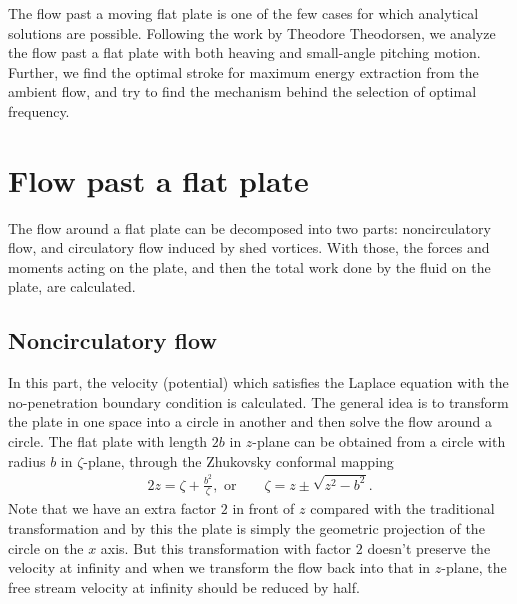 
The flow past a moving flat plate is one of the few cases for which analytical solutions are possible.
Following the work by Theodore Theodorsen, we analyze the flow past a flat plate with both heaving and small-angle pitching motion. 
Further, we find the optimal stroke for maximum energy extraction from the ambient flow, and try to find the mechanism behind the selection of optimal frequency. 

\section{Flow past a flat plate}

The flow around a flat plate can be decomposed into two parts: noncirculatory flow, and circulatory flow induced by shed vortices.
With those, the forces and moments acting on the plate, and then the total work done by the fluid on the plate, are calculated.

\subsection{Noncirculatory flow}

In this part, the velocity (potential) which satisfies the Laplace equation with the no-penetration boundary condition is calculated.
The general idea is to transform the plate in one space into a circle in another and then solve the flow around a circle. 
The flat plate with length $2b$ in $z$-plane can be obtained from a circle with radius $b$ in $\zeta$-plane, through the Zhukovsky conformal mapping
\begin{align}
2z = \zeta + \frac{b^2}{\zeta},    \text{   or~~~~~~}   \zeta =z \pm \sqrt{z^2-b^2}.
\end{align}
Note that we have an extra factor $2$ in front of $z$ compared with the traditional transformation and by this the plate is simply the geometric projection of the circle on the  $x$ axis.
But this transformation with factor $2$ doesn't preserve the velocity at infinity and when we transform the flow back into that in $z$-plane, the free stream velocity at infinity should be reduced by half.

